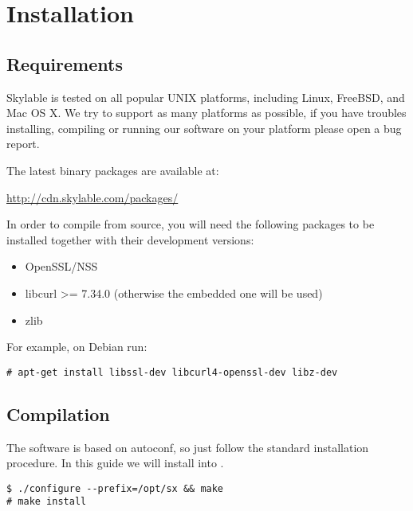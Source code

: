 \chapter{Installation}

\section*{Requirements}

Skylable \SX is tested on all popular UNIX platforms, including Linux,
FreeBSD, and Mac OS X. We try to support as many platforms as possible,
if you have troubles installing, compiling or running our software on
your platform please open a bug report.
\bigskip

The latest binary packages are available at:
\smallskip

\url{http://cdn.skylable.com/packages/}
\bigskip

In order to compile \SX from source, you
will need the following packages to be installed together with their
development versions:
\begin{itemize}
    \item OpenSSL/NSS
    \item libcurl >= 7.34.0 (otherwise the embedded one will be used)
    \item zlib
\end{itemize}
For example, on Debian run:
\small
\begin{lstlisting}
# apt-get install libssl-dev libcurl4-openssl-dev libz-dev
\end{lstlisting}
\LARGE

\section*{Compilation}

The software is based on autoconf, so just follow the standard installation
procedure. In this guide we will install \SX into .
\small
\begin{lstlisting}
$ ./configure --prefix=/opt/sx && make
# make install
\end{lstlisting}
\LARGE
